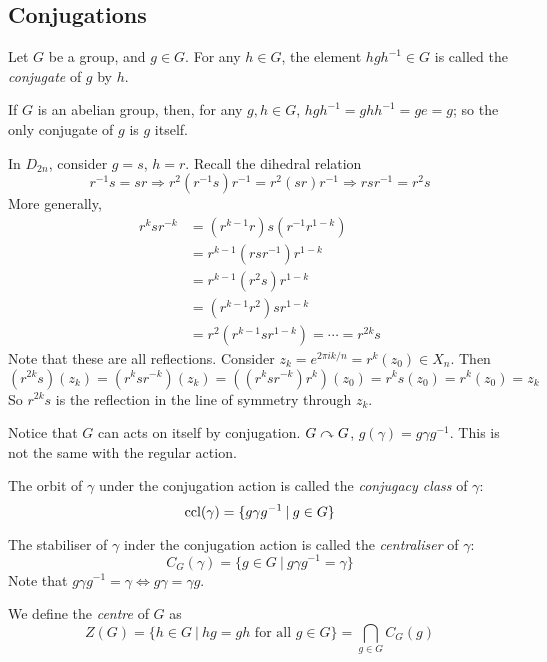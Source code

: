 \documentclass[10pt, a4paper, twoside]{report}
\begin{document}
\subsection{Conjugations}
\begin{definition}
    Let \(G\) be a group, and \(g\in G\). For any \(h\in G\), the element \(hgh^{-1}\in G\) is called the \emph{conjugate} of \(g\) by \(h\).
\end{definition}
\begin{example}
    If \(G\) is an abelian group, then, for any \(g,h\in G\), \(hgh^{-1}=ghh^{-1}=ge=g\); so the only conjugate of \(g\) is \(g\) itself.
\end{example}
\begin{example}
    In \(D_{2n}\), consider \(g=s\), \(h=r\). Recall the dihedral relation
    \[r^{-1}s=sr\Rightarrow r^2(r^{-1}s)r^{-1}=r^2(sr)r^{-1}\Rightarrow rsr^{-1}=r^2s\]
    More generally, 
    \begin{align*}
        r^ksr^{-k}&=(r^{k-1}r)s(r^{-1}r^{1-k}) \\
        &=r^{k-1}(rsr^{-1})r^{1-k} \\
        &=r^{k-1}(r^2s)r^{1-k} \\
        &=(r^{k-1}r^2)sr^{1-k} \\
        &=r^2(r^{k-1}sr^{1-k})=\cdots=r^{2k}s
    \end{align*}
    Note that these are all reflections. Consider \(z_k=e^{2\pi ik/n}=r^k(z_0)\in X_n\). Then 
    \[(r^{2k}s)(z_k)=(r^ksr^{-k})(z_k)=((r^ksr^{-k})r^k)(z_0)=r^ks(z_0)=r^k(z_0)=z_k\]
    So \(r^{2k}s\) is the reflection in the line of symmetry through \(z_k\).
\end{example}
Notice that \(G\) can acts on itself by conjugation. \(G\curvearrowright G\), \(g(\gamma)=g\gamma g^{-1}\). This is not the same with the regular action.
\begin{definition}
    The orbit of \(\gamma\) under the conjugation action is called the \emph{conjugacy class} of \(\gamma\):
    \[\operatorname{ccl}(\gamma)=\{g\gamma g^{-1}\:|\: g\in G\}\]
\end{definition}
\begin{definition}
    The stabiliser of \(\gamma\) inder the conjugation action is called the \emph{centraliser} of \(\gamma\): 
    \[C_G(\gamma)=\{g\in G\:|\:g\gamma g^{-1}=\gamma\}\]
    Note that \(g\gamma g^{-1}=\gamma\Leftrightarrow g\gamma=\gamma g\).
\end{definition}
\begin{definition}
    We define the \emph{centre} of \(G\) as 
    \[Z(G)=\{h\in G\:|\: hg=gh\text{  for all  }g\in G\}=\bigcap_{g\in G}C_G(g)\]
\end{definition}
\end{document}
